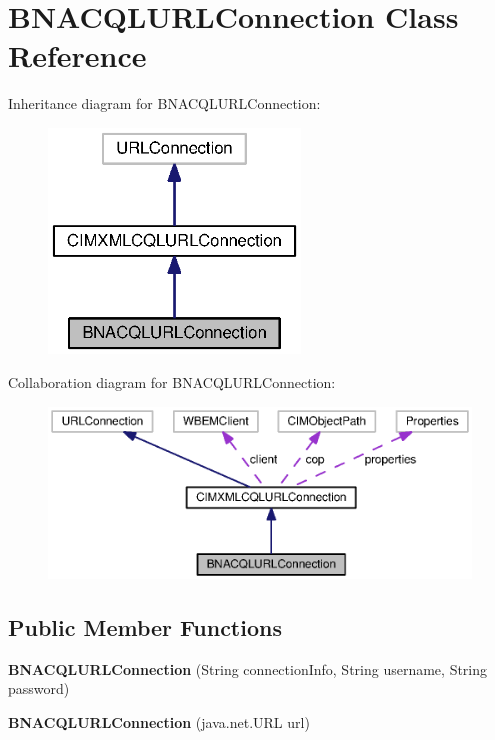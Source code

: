 \section{B\+N\+A\+C\+Q\+L\+U\+R\+L\+Connection Class Reference}
\label{classorg_1_1smallfoot_1_1parser_1_1bnacql_1_1BNACQLURLConnection}


Inheritance diagram for B\+N\+A\+C\+Q\+L\+U\+R\+L\+Connection\+:\nopagebreak
\begin{figure}[H]
\begin{center}
\leavevmode
\includegraphics[width=190pt]{classorg_1_1smallfoot_1_1parser_1_1bnacql_1_1BNACQLURLConnection__inherit__graph}
\end{center}
\end{figure}


Collaboration diagram for B\+N\+A\+C\+Q\+L\+U\+R\+L\+Connection\+:\nopagebreak
\begin{figure}[H]
\begin{center}
\leavevmode
\includegraphics[width=350pt]{classorg_1_1smallfoot_1_1parser_1_1bnacql_1_1BNACQLURLConnection__coll__graph}
\end{center}
\end{figure}
\subsection*{Public Member Functions}
\begin{DoxyCompactItemize}
\item 
{\bf B\+N\+A\+C\+Q\+L\+U\+R\+L\+Connection} (String connection\+Info, String username, String password)
\item 
{\bf B\+N\+A\+C\+Q\+L\+U\+R\+L\+Connection} (java.\+net.\+U\+R\+L url)
\end{DoxyCompactItemize}
